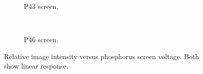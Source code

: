 \begin{figure}[!ht]
	\begin{subfigure}[t]{0.5\textwidth}
		
		\caption{P43 screen.}
		\label{}
	\end{subfigure}
	~
	\begin{subfigure}[t]{0.5\textwidth}
		
		\caption{P46 screen.}
		\label{}
	\end{subfigure}
	\caption[Relative image intensity versus phosphorus screen voltage]{Relative image intensity versus phosphorus screen voltage. Both show linear response.}
	\label{chap4:P_gain}
\end{figure}